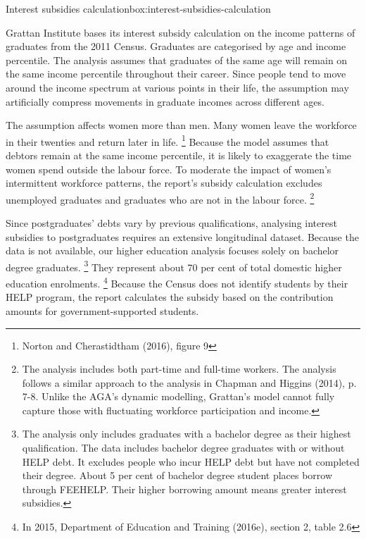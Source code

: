 \documentclass[embargoed]{grattan}
\begin{document}
{\begin{bigbox*}{Interest subsidies calculation}{box:interest-subsidies-calculation}

Grattan Institute bases its interest subsidy calculation on the income patterns of graduates from the 2011 Census.
Graduates are categorised by age and income percentile.
The analysis assumes that graduates of the same age will remain on the same income percentile throughout their career.
Since people tend to move around the income spectrum at various points in their life, the assumption may artificially compress movements in graduate incomes across different ages.

The assumption affects women more than men.
Many women leave the workforce in their twenties and return later in life.%
\footnote{Norton and Cherastidtham (2016), figure 9} Because the model assumes that debtors remain at the same income percentile, it is likely to exaggerate the time women spend outside the labour force.
To moderate the impact of women's intermittent workforce patterns, the report's subsidy calculation excludes unemployed graduates and graduates who are not in the labour force.%
\footnote{The analysis includes both part-time and full-time workers.
The analysis follows a similar approach to the analysis in Chapman and Higgins (2014), p. 7-8.
Unlike the \gls{AGA}'s dynamic modelling, Grattan's model cannot fully capture those with fluctuating workforce participation and income.}

Since postgraduates' debts vary by previous qualifications, analysing interest subsidies to postgraduates requires an extensive longitudinal dataset.
Because the data is not available, our higher education analysis focuses solely on bachelor degree graduates.%
\footnote{The analysis only includes graduates with a bachelor degree as their highest qualification.
The data includes bachelor degree graduates with or without \gls{HELP} debt.
It excludes people who incur \gls{HELP} debt but have not completed their degree.
About 5 per cent of bachelor degree student places borrow through \gls{FEEHELP}.
Their higher borrowing amount means greater interest subsidies.} They represent about 70 per cent of total domestic higher education enrolments.%
\footnote{In 2015, Department of Education and Training (2016e), section 2, table 2.6} Because the Census does not identify students by their \gls{HELP} program, the report calculates the subsidy based on the contribution amounts for government-supported students.
\end{bigbox*}


}
\end{document}
